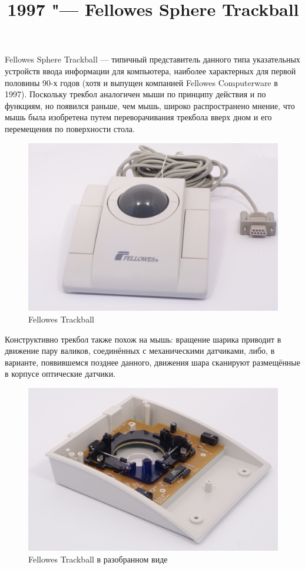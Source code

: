 \documentclass[11pt, a4paper]{article}
\begin{document}
\title{1997 "--- Fellowes Sphere Trackball}
\date{}
\maketitle
Fellowes Sphere Trackball — типичный представитель данного типа указательных устройств ввода информации для компьютера, наиболее характерных для первой половины 90-х годов (хотя и выпущен компанией Fellowes Computerware в 1997). Поскольку трекбол аналогичен мыши по принципу действия и по функциям, но появился раньше, чем мышь, широко распространено мнение, что мышь была изобретена путем переворачивания трекбола вверх дном и его перемещения по поверхности стола.

\begin{figure}[h]
    \centering
    \includegraphics[scale=0.2]{1997_fellowes_trackball/fellowes.jpg}
    \caption{Fellowes Trackball}
    \label{fig:pic}
\end{figure}

Конструктивно трекбол также похож на мышь: вращение шарика приводит в движение пару валиков, соединённых с механическими датчиками, либо, в варианте, появившемся позднее данного, движения шара сканируют размещённые в корпусе оптические датчики. 

\begin{figure}[h]
    \centering
    \includegraphics[scale=0.3]{1997_fellowes_trackball/fellowes2.jpg}
    \caption{Fellowes Trackball в разобранном виде}
    \label{fig:inside}
\end{figure}
\end{document}

